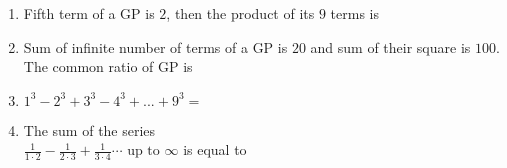 \documentclass[journal,12pt,twocolumn]{IEEEtran}
\theoremstyle{remark}
\begin{document}
\begin{enumerate}[label={\arabic*.}]
\item {Fifth term of a GP is $2$, then the product of its $9$ terms is}
{\hfill{}}
\begin{enumerate}	
\end{enumerate}

\item {Sum of infinite number of terms of a GP is $20$ and sum of their square is $100$. The common ratio of GP is}
{\hfill{}} 
\begin{enumerate}
\end{enumerate} 

\item {$1^{3}-2^{3}+3^{3}-4^{3}+...
+9^{3}=$}
{\hfill{}} 
\begin{enumerate}
\end{enumerate}

\item {The sum of the series \\ $\frac{1}{1\cdot2}-\frac{1}{2\cdot3}+\frac{1}{3\cdot4}\cdots \text{ up to } \infty$ is equal to} 
{\hfill{}} 
\begin{enumerate}
\end{enumerate}


\end{enumerate}
\end{document}

